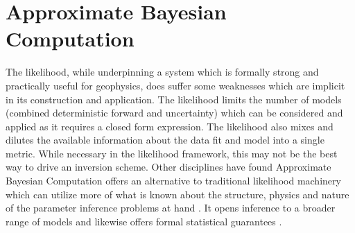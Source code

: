 

\pagebreak



\section{Approximate Bayesian Computation}
\label{ApproximateBayesianComputation}

The likelihood, while underpinning a system which is formally strong and practically useful for geophysics, does suffer some weaknesses which are implicit in its construction and application. The likelihood limits the number of models (combined deterministic forward and uncertainty) which can be considered and applied as it requires a closed form expression. The likelihood also mixes and dilutes the available information about the data fit and model into a single metric. While necessary in the likelihood framework, this may not be the best way to drive an inversion scheme. Other disciplines have found Approximate Bayesian Computation offers an alternative to traditional likelihood machinery which can utilize more of what is known about the structure, physics and nature of the parameter inference problems at hand \citep{Tavare1997,Ratmann2009,vrugt2013toward}. It opens inference to a broader range of models and likewise offers formal statistical guarantees \citep{Sunnaker2013}.\par

